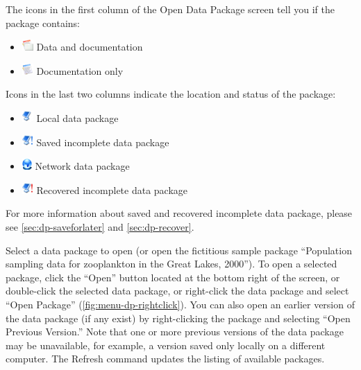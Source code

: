 The icons in the first column of the Open Data Package screen tell you
if the package contains:
\begin{itemize}
  \parskip 3pt
  \itemsep 0pt
  \item[] \includegraphics[scale=0.7]{images/indicator-hasdata.png}
    Data and documentation
  \item[] \includegraphics[scale=0.7]{images/indicator-hasnodata.png}
	Documentation only 
\end{itemize}

Icons in the last two columns indicate the location and status of the
package:
\begin{itemize}
  \parskip 3pt
  \itemsep 0pt
  \item[] \includegraphics[scale=0.7]{images/indicator-dp-local.png}
  Local data package
  \item[] \includegraphics[scale=0.7]{images/indicator-dp-incomplete.png}
  Saved incomplete data package
  \item[] \includegraphics[scale=0.7]{images/indicator-dp-network.png}
  Network data package
  \item[] \includegraphics[scale=0.7]{images/indicator-dp-recovered.png}
  Recovered incomplete data package
\end{itemize}

For more information about saved and recovered incomplete data package,
please see \autoref{sec:dp-saveforlater} and
\autoref{sec:dp-recover}.

Select a data package to open (or open the fictitious sample package
``Population sampling data for zooplankton in the Great Lakes, 2000'').
To open a selected package, click the ``Open'' button located at the
bottom right of the screen, or double-click the selected data package,
or right-click the data package and select ``Open Package''
(\autoref{fig:menu-dp-rightclick}). You can also open an earlier version
of the data package (if any exist) by right-clicking the package and
selecting ``Open Previous Version.'' Note that one or more previous
versions of the data package may be unavailable, for example, a version
saved only locally on a different computer. The Refresh command updates
the listing of available packages.

